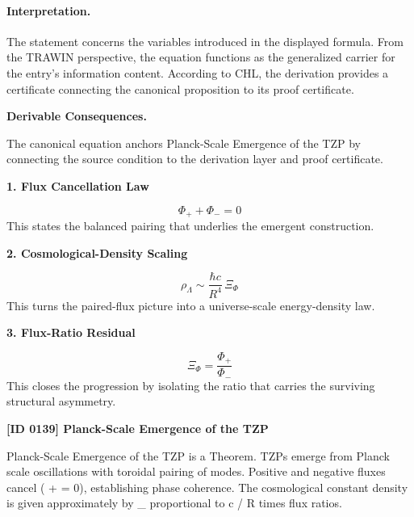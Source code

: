 \paragraph{Interpretation.}
The statement concerns the variables introduced in the displayed formula. From the TRAWIN perspective, the equation functions as the generalized carrier for the entry’s information content. According to CHL, the derivation provides a certificate connecting the canonical proposition to its proof certificate.

\par\vspace{0.35em}
\noindent\textbf{Derivable Consequences.}\quad
\begingroup
\footnotesize
\raggedright
The canonical equation anchors Planck-Scale Emergence of the TZP by connecting the source condition to the derivation layer and proof certificate.
\par\endgroup

\noindent\textbf{1. Flux Cancellation Law}\par
\[
\Phi_{+}+\Phi_{-}=0
\]
\noindent This states the balanced pairing that underlies the emergent construction.\par
\noindent\textbf{2. Cosmological-Density Scaling}\par
\[
\rho_{\Lambda}\sim \frac{\hbar c}{R^4}\,\Xi_{\Phi}
\]
\noindent This turns the paired-flux picture into a universe-scale energy-density law.\par
\noindent\textbf{3. Flux-Ratio Residual}\par
\[
\Xi_{\Phi}=\frac{\Phi_{+}}{\Phi_{-}}
\]
\noindent This closes the progression by isolating the ratio that carries the surviving structural asymmetry.\par

\clearpage
\noindent\textbf{[ID 0139] Planck-Scale Emergence of the TZP}\par
\vspace{0.35em}
\begingroup\small
{}
Planck-Scale Emergence of the TZP is a Theorem. TZPs emerge from Planck scale oscillations with toroidal pairing of modes. Positive and negative fluxes cancel (   +    = 0), establishing phase coherence. The cosmological constant density is given approximately by  \_  proportional to   c / R  times flux ratios.

